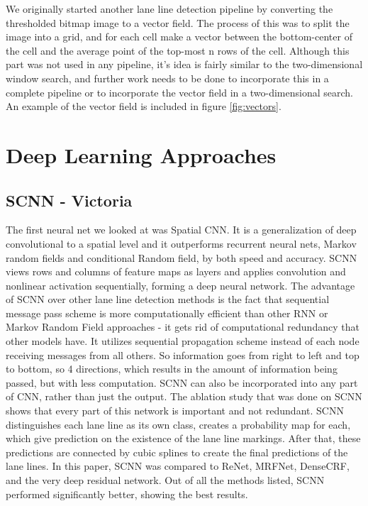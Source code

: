 \documentclass[twoside,twocolumn]{article}
\begin{document}
\par We originally started another lane line detection pipeline by converting the thresholded bitmap image to a vector field. The process of this was to split the image into a grid, and for each cell make a vector between the bottom-center of the cell and the average point of the top-most n rows of the cell. Although this part was not used in any pipeline, it's idea is fairly similar to the two-dimensional window search, and further work needs to be done to incorporate this in a complete pipeline or to incorporate the vector field in a two-dimensional search. An example of the vector field is included in figure \ref{fig:vectors}.



\section{Deep Learning Approaches}

\subsection{SCNN - Victoria}
\par The first neural net we looked at was Spatial CNN. It is a generalization of deep convolutional to a spatial level and it outperforms recurrent neural nets, Markov random fields and conditional Random field, by both speed and accuracy.  SCNN views rows and columns of feature maps as layers and applies convolution and nonlinear activation sequentially, forming a deep neural network. The advantage of SCNN over other lane line detection methods is the fact that sequential message pass scheme is more computationally efficient than other RNN or Markov Random Field approaches - it gets rid of computational redundancy that other models have. It utilizes sequential propagation scheme instead of each node receiving messages from all others. So information goes  from right to left and top to bottom, so 4 directions, which results in the amount of information being passed, but with less computation. SCNN can also be incorporated into any part of CNN, rather than just the output. The ablation study that was done on SCNN shows that every part of this network is important  and not redundant. SCNN distinguishes each lane line as its own class, creates a probability map for each, which give prediction on the existence of the lane line markings. After that, these predictions are connected by cubic splines to create the final predictions of the lane lines. In this paper, SCNN was compared to ReNet, MRFNet, DenseCRF, and the very deep residual network. Out of all the methods listed, SCNN performed significantly better, showing the best results.
\end{document}

